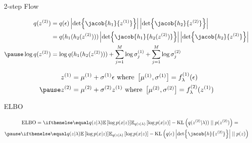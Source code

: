 \documentclass[14pt]{beamer}
\begin{document}
\begin{frame}{2-step Flow}
\begin{small}
\begin{equation*}
\begin{aligned}
q(z^{(2)}) &= q(\epsilon)\abs{\det\jacob{h_{1}}{z^{(1)}}}\abs{\det\jacob{h_{2}}{z^{(2)}}} \\
&= q(h_{1}(h_{2}(z^{(2)})))\abs{\det\jacob{h_{1}}{h_{2}(z^{(2)})}}\abs{\det\jacob{h_{2}}{z^{(2)}}} \\ \pause
\log q(z^{(2)}) &= \log q(h_{1}(h_{2}(z^{(2)}))) + \sum_{j=1}^{M}\log\sigma^{(1)}_{j} + \sum_{j=1}^{M}\log\sigma^{(2)}_{j}
\end{aligned}
\end{equation*}
\end{small}
\pause
\begin{equation*}
\begin{aligned}
z^{(1)} &= \mu^{(1)} + \sigma^{(1)}\epsilon \text{ where } \begin{bmatrix}\mu^{(1)}, \sigma^{(1)}\end{bmatrix} = f^{(1)}_{\lambda}(\epsilon) \\ \pause
z^{(2)} &= \mu^{(2)} + \sigma^{(2)}z^{(1)} \text{ where } \begin{bmatrix}\mu^{(2)}, \sigma^{(2)}\end{bmatrix} = f^{(2)}_{\lambda}(z^{(1)})
\end{aligned}
\end{equation*}
\end{frame}

\begin{frame}{ELBO}
\begin{small}
\begin{equation*}
\begin{aligned}
&\ELBO = \E[q(z|\lambda)]{\log p(x|z)} - \KL{q(z^{(2)}|\lambda))}{p(z^{(2)})} = \\ \pause
&\E[q(z|\lambda)]{\log p(x|z)} - \KL{q(\epsilon)\abs{\det\jacob{h}{z^{(2)}}}}{p(z)}
\end{aligned}
\end{equation*}
\end{small}
\end{frame}
\end{document}
